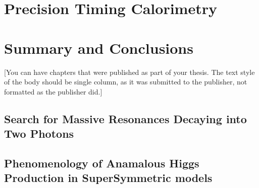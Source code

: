 \documentclass[14pt]{caltech_thesis}
\begin{document}
\part{ Precision Timing Calorimetry}

\part{Summary and Conclusions}


[You can have chapters that were published as part of your thesis. The
text style of the body should be single column, as it was submitted to
the publisher, not formatted as the publisher did.]

\printbibliography[heading=bibintoc]

 
\appendix

\chapter{Search for Massive Resonances Decaying into Two Photons}
\chapter{Phenomenology of Anamalous Higgs Production in SuperSymmetric models}

\printindex

\theendnotes

\end{document}
